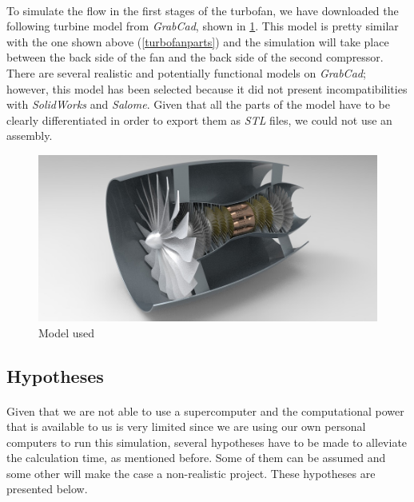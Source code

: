 \paragraph{}To simulate the flow in the first stages of the turbofan, we have downloaded the following turbine model from \textit{GrabCad}, shown in \ref{turbinegrabcad}. This model is pretty similar with the one shown above (\ref{turbofanparts}) and the simulation will take place between the back side of the fan and the back side of the second compressor. There are several realistic and potentially functional models on \textit{GrabCad}; however, this model has been selected because it did not present incompatibilities with \textit{SolidWorks} and \textit{Salome}. Given that all the parts of the model have to be clearly differentiated in order to export them as \textit{STL} files, we could not use an assembly.

\begin{figure}[h!]
\centering
\includegraphics[scale=0.54]{./img/Turbofan.png}
\caption{Model used}
\label{turbinegrabcad}
\end{figure}

\subsection{Hypotheses}

\paragraph{}Given that we are not able to use a supercomputer and the computational power that is available to us is very limited since we are using our own personal computers to run this simulation, several hypotheses have to be made to alleviate the calculation time, as mentioned before. Some of them can be assumed and some other will make the case a non-realistic project. These hypotheses are presented below.

